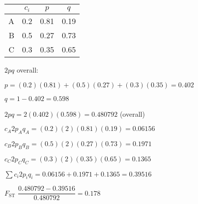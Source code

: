 \documentclass[12pt, addpoints, hidelinks]{exam}
\newcommand{\fst}{$F_{\mathrm{ST}}$}
\begin{document}
\begin{questions}
\begin{multicols}{2}
	\begin{tabular}{rccc}
	\toprule
	& $c_i$ & $p$  & $q$ \tabularnewline
	\midrule
	A & 0.2  & 0.81 & 0.19 \tabularnewline
	B & 0.5 & 0.27 & 0.73 \tabularnewline
	C & 0.3  & 0.35 & 0.65 \tabularnewline
	\bottomrule
\end{tabular}

			$2pq$ overall:

$p = (0.2)(0.81) + (0.5)(0.27) + (0.3)(0.35) = 0.402$

$q = 1 - 0.402 = 0.598$

$2pq = 2(0.402)(0.598) = 0.480792$ (overall)

			$c_A2p_Aq_A = (0.2)(2)(0.81)(0.19) = 0.06156$

			$c_B2p_Bq_B = (0.5)(2)(0.27)(0.73) = 0.1971$

			$c_C2p_Cq_C = (0.3)(2)(0.35)(0.65) = 0.1365$

			$\sum c_i 2p_iq_i = 0.06156 + 0.1971 + 0.1365 = 0.39516$
			
			 \fst{} $\dfrac{0.480792 - 0.39516}{0.480792} = 0.178$ 
\end{multicols}


\fi


\end{questions}
\end{document}
